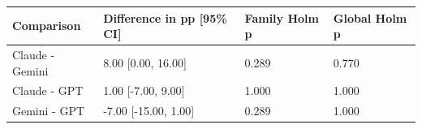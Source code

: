 \begin{tabular}{llll}
\hline
Comparison & Difference in pp [95\% CI] & Family Holm p & Global Holm p \\
\hline
Claude - Gemini & 8.00 [0.00, 16.00] & 0.289 & 0.770 \\
Claude - GPT & 1.00 [-7.00, 9.00] & 1.000 & 1.000 \\
Gemini - GPT & -7.00 [-15.00, 1.00] & 0.289 & 1.000 \\
\hline
\end{tabular}
